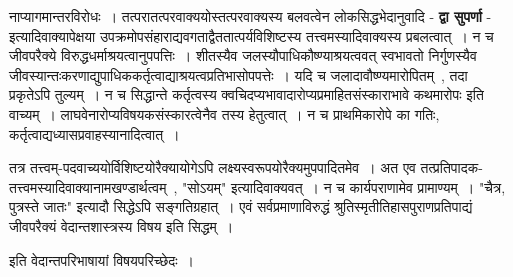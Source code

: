 	नाप्यागमान्तरविरोधः~। तत्परातत्परवाक्ययोस्तत्परवाक्यस्य बलवत्वेन लोकसिद्धभेदानुवादि - {\bfseries द्वा सुपर्णा} - इत्यादिवाक्यापेक्षया उपक्रमोपसंहाराद्यवगताद्वैततात्पर्यविशिष्टस्य तत्त्वमस्यादिवाक्यस्य प्रबलत्वात्~। न च जीवपरैक्ये विरुद्धधर्माश्रयत्वानुपपत्तिः~। शीतस्यैव जलस्यौपाधिकौष्ण्याश्रयत्ववत् स्वभावतो निर्गुणस्यैव जीवस्यान्तःकरणाद्युपाधिककर्तृत्वाद्याश्रयत्वप्रतिभासोपपत्तेः~। यदि च जलादावौष्ण्यमारोपितम्~, तदा प्रकृतेऽपि तुल्यम्~। न च सिद्धान्ते कर्तृत्वस्य क्वचिदप्यभावादारोप्यप्रमाहितसंस्काराभावे कथमारोपः इति वाच्यम्~। लाघवेनारोप्यविषयकसंस्कारत्वेनैव तस्य हेतुत्वात्~। न च प्राथमिकारोपे का गतिः, कर्तृत्वाद्यध्यासप्रवाहस्यानादित्वात्~।\par
	तत्र तत्त्वम्-पदवाच्ययोर्विशिष्टयोरैक्यायोगेऽपि लक्ष्यस्वरूपयोरैक्यमुपपादितमेव~। अत एव तत्प्रतिपादक-तत्त्वमस्यादिवाक्यानामखण्डार्थत्वम्~, "सोऽयम्" इत्यादिवाक्यवत्~। न च कार्यपराणामेव प्रामाण्यम्~। "चैत्र, पुत्रस्ते जातः" इत्यादौ सिद्धेऽपि सङ्गतिग्रहात्~। एवं सर्वप्रमाणाविरुद्धं श्रुतिस्मृतीतिहासपुराणप्रतिपाद्यं जीवपरैक्यं वेदान्तशास्त्रस्य विषय इति सिद्धम्~।\par
	\begin{center} इति वेदान्तपरिभाषायां विषयपरिच्छेदः~।\end{center} 
